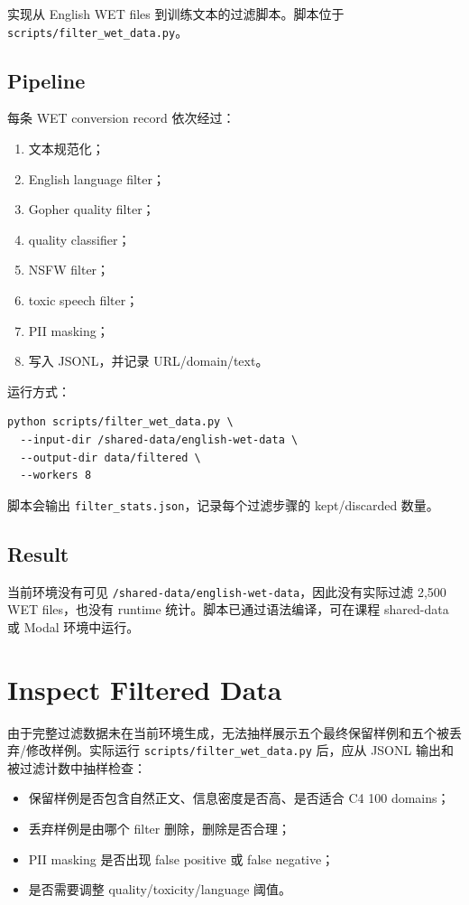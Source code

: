 \documentclass[UTF8,11pt]{ctexart}
\begin{document}
实现从 English WET files 到训练文本的过滤脚本。脚本位于 \texttt{scripts/filter\_wet\_data.py}。

\subsection*{Pipeline}

每条 WET conversion record 依次经过：

\begin{enumerate}
  \item 文本规范化；
  \item English language filter；
  \item Gopher quality filter；
  \item quality classifier；
  \item NSFW filter；
  \item toxic speech filter；
  \item PII masking；
  \item 写入 JSONL，并记录 URL/domain/text。
\end{enumerate}

运行方式：

\begin{lstlisting}
python scripts/filter_wet_data.py \
  --input-dir /shared-data/english-wet-data \
  --output-dir data/filtered \
  --workers 8
\end{lstlisting}

脚本会输出 \texttt{filter\_stats.json}，记录每个过滤步骤的 kept/discarded 数量。

\subsection*{Result}

当前环境没有可见 \texttt{/shared-data/english-wet-data}，因此没有实际过滤 2,500 WET files，也没有 runtime
统计。脚本已通过语法编译，可在课程 shared-data 或 Modal 环境中运行。

\section{Inspect Filtered Data}

由于完整过滤数据未在当前环境生成，无法抽样展示五个最终保留样例和五个被丢弃/修改样例。实际运行
\texttt{scripts/filter\_wet\_data.py} 后，应从 JSONL 输出和被过滤计数中抽样检查：

\begin{itemize}
  \item 保留样例是否包含自然正文、信息密度是否高、是否适合 C4 100 domains；
  \item 丢弃样例是由哪个 filter 删除，删除是否合理；
  \item PII masking 是否出现 false positive 或 false negative；
  \item 是否需要调整 quality/toxicity/language 阈值。
\end{itemize}
\end{document}
